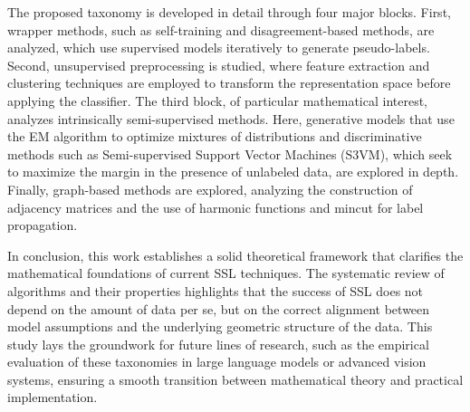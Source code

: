 The proposed taxonomy is developed in detail through four major blocks. First, wrapper methods, such as self-training and disagreement-based methods, are analyzed, which use supervised models iteratively to generate pseudo-labels. Second, unsupervised preprocessing is studied, where feature extraction and clustering techniques are employed to transform the representation space before applying the classifier. The third block, of particular mathematical interest, analyzes intrinsically semi-supervised methods. Here, generative models that use the EM algorithm to optimize mixtures of distributions and discriminative methods such as Semi-supervised Support Vector Machines (S3VM), which seek to maximize the margin in the presence of unlabeled data, are explored in depth. Finally, graph-based methods are explored, analyzing the construction of adjacency matrices and the use of harmonic functions and mincut for label propagation.

In conclusion, this work establishes a solid theoretical framework that clarifies the mathematical foundations of current \acrshort{SSL} techniques. The systematic review of algorithms and their properties highlights that the success of \acrshort{SSL} does not depend on the amount of data per se, but on the correct alignment between model assumptions and the underlying geometric structure of the data. This study lays the groundwork for future lines of research, such as the empirical evaluation of these taxonomies in large language models or advanced vision systems, ensuring a smooth transition between mathematical theory and practical implementation.